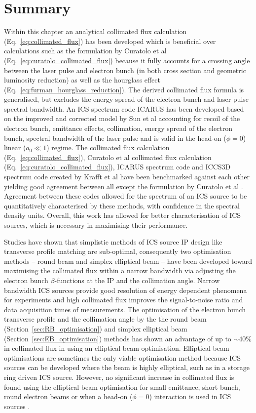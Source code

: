 \documentclass[../main.tex]{subfiles}
\begin{document}
\section{Summary}

Within this chapter an analytical collimated flux calculation (Eq.~\ref{eq:collimated_flux}) has been developed which is beneficial over calculations such as the formulation by Curatolo et al (Eq.~\ref{eq:curatolo_collimated_flux}) \cite{curatolo2017analytical} because it fully accounts for a crossing angle between the laser pulse and electron bunch (in both cross section and geometric luminosity reduction) as well as the hourglass effect (Eq.~\ref{eq:furman_hourglass_reduction}). The derived collimated flux formula is generalised, but excludes the energy spread of the electron bunch and laser pulse spectral bandwidth. An ICS spectrum code \textsc{ICARUS} has been developed based on the improved and corrected model by Sun et al \cite{sun2009characterizations,sun2011theoretical} accounting for recoil of the electron bunch, emittance effects, collimation, energy spread of the electron bunch, spectral bandwidth of the laser pulse and is valid in the head-on ($\phi=0$) linear ($a_{0} \ll 1$) regime. The collimated flux calculation (Eq.~\ref{eq:collimated_flux}), Curatolo et al collimated flux calculation (Eq.~\ref{eq:curatolo_collimated_flux}), \textsc{ICARUS} spectrum code and \textsc{ICCS3D} spectrum code created by Krafft et al \cite{krafft2016laser,ranjan2018simulation} have been benchmarked against each other yielding good agreement between all except the formulation by Curatolo et al \cite{curatolo2017analytical}. Agreement between these codes allowed for the spectrum of an ICS source to be quantitatively characterised by these methods, with confidence in the spectral density units. Overall, this work has allowed for better characterisation of ICS sources, which is necessary in maximising their performance.

Studies have shown that simplistic methods of ICS source IP design like transverse profile matching are sub-optimal, consequently two optimisation methods -- round beam and simplex elliptical beam -- have been developed toward maximising the collimated flux within a narrow bandwidth via adjusting the electron bunch $\beta$-functions at the IP and the collimation angle. Narrow bandwidth ICS sources provide good resolution of energy dependent phenomena for experiments and high collimated flux improves the signal-to-noise ratio and data acquisition times of measurements. The optimisation of the electron bunch transverse profile and the collimation angle by the the round beam (Section~\ref{sec:RB_optimisation}) and simplex elliptical beam (Section~\ref{sec:EB_optimisation}) methods has shown an advantage of up to $\sim 40$\% in collimated flux in using an elliptical beam optimisation. Elliptical beam optimisations are sometimes the only viable optimisation method because ICS sources can be developed where the beam is highly elliptical, such as in a storage ring driven ICS source. However, no significant increase in collimated flux is found using the elliptical beam optimisation for small emittance, short bunch, round electron beams or when a head-on ($\phi = 0$) interaction is used in ICS sources .
\end{document}
